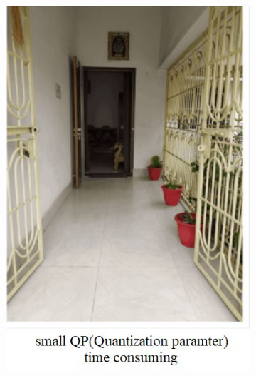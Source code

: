 \documentclass[a4paper]{article}
\begin{document}
\begin{figure}[H]
\begin{subfigure}{.3\textwidth}
		\includegraphics[width=.9\linewidth]{q1_2}
	\end{subfigure}
	\begin{subfigure}{.3\textwidth}
		\centering

\end{subfigure}
\end{figure}
\end{document}
